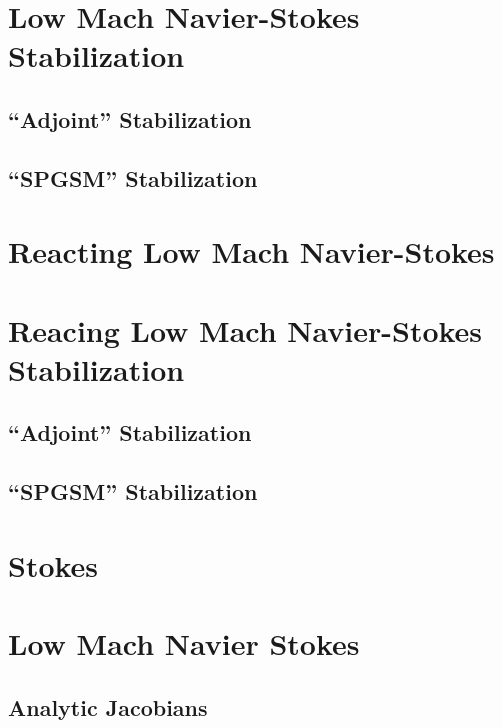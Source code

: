 \documentclass[twoside]{report}
\begin{document}
\chapter{Low Mach Navier-Stokes Stabilization}
\section{``Adjoint'' Stabilization}
\section{``SPGSM'' Stabilization}

\chapter{Reacting Low Mach Navier-Stokes}

\chapter{Reacing Low Mach Navier-Stokes Stabilization}
\section{``Adjoint'' Stabilization}
\section{``SPGSM'' Stabilization}

\chapter{Stokes}





\chapter{Low Mach Navier Stokes}

\section{Analytic Jacobians}


\end{document}
